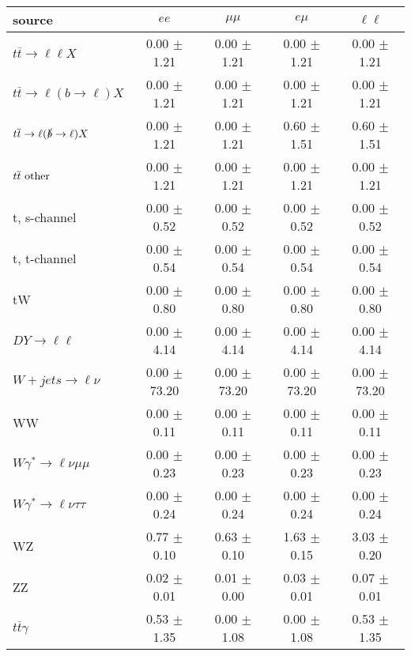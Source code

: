 \begin{tabular}{l|cccc} \hline\hline
source & $ee$ & $\mu\mu$ & $e\mu$ & $\ell\ell $ \\
\hline
$t\overline{t} \rightarrow \ell \ell X$ &  0.00 $\pm$  1.21 &  0.00 $\pm$  1.21 &  0.00 $\pm$  1.21 &  0.00 $\pm$  1.21 \\
$t\overline{t} \rightarrow \ell (b \rightarrow \ell) X$ &  0.00 $\pm$  1.21 &  0.00 $\pm$  1.21 &  0.00 $\pm$  1.21 &  0.00 $\pm$  1.21 \\
$t\overline{t} \rightarrow \ell (\slashed b \rightarrow \ell) X$ &  0.00 $\pm$  1.21 &  0.00 $\pm$  1.21 &  0.60 $\pm$  1.51 &  0.60 $\pm$  1.51 \\
        $t\overline{t}\ \rm{other}$ &  0.00 $\pm$  1.21 &  0.00 $\pm$  1.21 &  0.00 $\pm$  1.21 &  0.00 $\pm$  1.21 \\
\hline
                       t, s-channel &  0.00 $\pm$  0.52 &  0.00 $\pm$  0.52 &  0.00 $\pm$  0.52 &  0.00 $\pm$  0.52 \\
                       t, t-channel &  0.00 $\pm$  0.54 &  0.00 $\pm$  0.54 &  0.00 $\pm$  0.54 &  0.00 $\pm$  0.54 \\
                                 tW &  0.00 $\pm$  0.80 &  0.00 $\pm$  0.80 &  0.00 $\pm$  0.80 &  0.00 $\pm$  0.80 \\
\hline
         $DY \rightarrow \ell \ell$ &  0.00 $\pm$  4.14 &  0.00 $\pm$  4.14 &  0.00 $\pm$  4.14 &  0.00 $\pm$  4.14 \\
      $W+jets \rightarrow \ell \nu$ &  0.00 $\pm$ 73.20 &  0.00 $\pm$ 73.20 &  0.00 $\pm$ 73.20 &  0.00 $\pm$ 73.20 \\
                                 WW &  0.00 $\pm$  0.11 &  0.00 $\pm$  0.11 &  0.00 $\pm$  0.11 &  0.00 $\pm$  0.11 \\
\hline
$W\gamma^{*} \rightarrow \ell \nu \mu\mu$ &  0.00 $\pm$  0.23 &  0.00 $\pm$  0.23 &  0.00 $\pm$  0.23 &  0.00 $\pm$  0.23 \\
$W\gamma^{*} \rightarrow \ell \nu \tau\tau$ &  0.00 $\pm$  0.24 &  0.00 $\pm$  0.24 &  0.00 $\pm$  0.24 &  0.00 $\pm$  0.24 \\
                                 WZ &  0.77 $\pm$  0.10 &  0.63 $\pm$  0.10 &  1.63 $\pm$  0.15 &  3.03 $\pm$  0.20 \\
                                 ZZ &  0.02 $\pm$  0.01 &  0.01 $\pm$  0.00 &  0.03 $\pm$  0.01 &  0.07 $\pm$  0.01 \\
\hline
              $t\overline{t}\gamma$ &  0.53 $\pm$  1.35 &  0.00 $\pm$  1.08 &  0.00 $\pm$  1.08 &  0.53 $\pm$  1.35 \\

\end{tabular}
